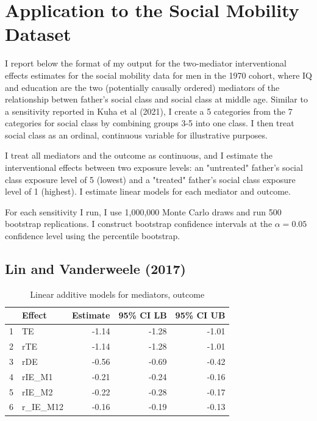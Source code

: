 \documentclass[12pt]{article} %
\numberwithin{equation}{section} %
\begin{document}
\section{Application to the Social Mobility Dataset}

I report below the format of my output for the two-mediator interventional effects estimates for the social mobility data for
men in the 1970 cohort,
where IQ and education are the two (potentially causally ordered) mediators of the relationship betwen father's social class
and social class at middle age. Similar to a sensitivity reported in Kuha et al (2021), I create a 5 categories from 
the 7 categories for social class by combining groups 3-5 into one class. I then treat social class as an ordinal, continuous
variable for illustrative purposes. 

I treat all mediators and the outcome as continuous, and I estimate the interventional effects between two exposure levels:
an "untreated" father's social class exposure level of 5 (lowest) and a "treated" father's social class exposure level of 1
(highest). I estimate linear models for each mediator and outcome. 

For each sensitivity I run, I use 1,000,000 Monte Carlo draws and run 500 bootstrap replications. I construct bootstrap
confidence intervals at the $\alpha = 0.05$ confidence level using the percentile bootstrap. 

\subsection{Lin and Vanderweele (2017)}

\begin{table}[ht]
\centering
\begin{tabular}{rlrrr}
  \hline
 & Effect & Estimate & 95\% CI LB & 95\% CI UB \\ 
  \hline
1 & TE & -1.14 & -1.28 & -1.01 \\ 
  2 & rTE & -1.14 & -1.28 & -1.01 \\ 
  3 & rDE & -0.56 & -0.69 & -0.42 \\ 
  4 & rIE\_M1 & -0.21 & -0.24 & -0.16 \\ 
  5 & rIE\_M2 & -0.22 & -0.28 & -0.17 \\ 
  6 & r\_IE\_M12 & -0.16 & -0.19 & -0.13 \\ 
   \hline
\end{tabular}
\caption{Linear additive models for mediators, outcome}
\end{table}
\end{document}
